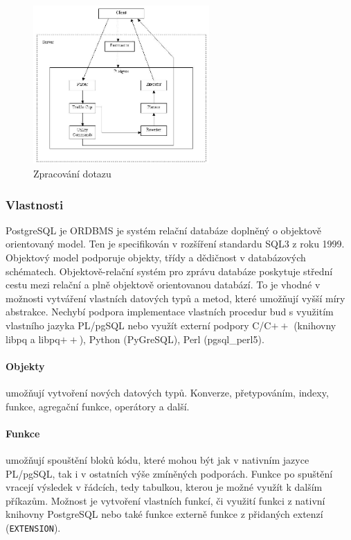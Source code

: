 \documentclass[a4paper,12pt]{report}
\begin{document}
  
\begin{figure}[h!]
    \centering
    \includegraphics[width=0.6\textwidth]{./img/implementace/postgremodel1.jpg}
    \caption[Dotaz PostgreSQL]{\centering  Zpracování dotazu \footnotemark}
 \end{figure}   




\subsubsection{Vlastnosti}
PostgreSQL je \ac{ORDBMS} je systém relační databáze doplněný o objektově orientovaný model. Ten je specifikován v rozšíření standardu SQL3 z roku 1999\cite{sql1999}. Objektový model podporuje objekty, třídy a dědičnost v databázových schématech. Objektově-relační systém pro zprávu databáze  poskytuje střední cestu mezi relační a plně objektově orientovanou databází. To je vhodné v možnosti vytváření vlastních datových typů a metod, které umožňují vyšší míry abstrakce. Nechybí podpora implementace vlastních procedur bud s využitím vlastního jazyka PL/pgSQL nebo využít externí podpory C/C$++$ (knihovny libpq a libpq$++$), Python (PyGreSQL), Perl (pgsql\_perl5).


\paragraph{Objekty} umožňují vytvoření nových datových typů. Konverze, přetypováním, indexy, funkce, agregační funkce, operátory a další.  
\paragraph*{Funkce} umožňují spouštění bloků kódu, které mohou být jak v nativním jazyce PL/pgSQL, tak i v ostatních výše zmíněných podporách. Funkce po spuštění vracejí výsledek v řádcích, tedy tabulkou, kterou je možné využít k dalším příkazům. Možnost je vytvoření vlastních funkcí, či využití funkci z nativní knihovny PostgreSQL nebo také funkce externě funkce z přidaných extenzí (\texttt{EXTENSION}).
\end{document}
